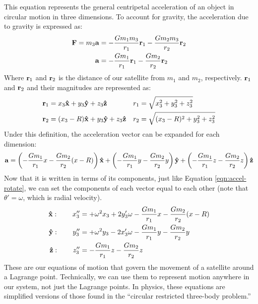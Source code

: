 This equation represents the general centripetal acceleration of an object in circular motion in three dimensions.
To account for gravity, the acceleration due to gravity is expressed as:
\begin{align*}
	\bm{\mathbf{F}} = m_3\bm{\mathbf{a}} &= - \frac{Gm_1m_3}{r_1}\bm{\mathbf{r}}_1 - \frac{Gm_2m_3}{r_2}\bm{\mathbf{r}}_2 \\
	\bm{\mathbf{a}} &= - \frac{Gm_1}{r_1}\bm{\mathbf{r}}_1 - \frac{Gm_2}{r_2}\bm{\mathbf{r}}_2
\end{align*}
Where $\bm{\mathbf{r}}_1$ and $\bm{\mathbf{r}}_2$ is the distance of our satellite from $m_1$ and $m_2$, respectively.
$\bm{\mathbf{r}}_1$ and $\bm{\mathbf{r}}_2$ and their magnitudes are represented as:
\begin{align*}
	\bvec{r}_1 &= x_3\uvec{x} + y_3\uvec{y} + z_3\uvec{z} & r_1 &= \sqrt{x_3^2 + y_3^2 + z_3^2} \\
	\bvec{r}_2 &= (x_3 - R)\uvec{x} + y_3\uvec{y} + z_3\uvec{z} & r_2 &= \sqrt{(x_3 - R)^2 + y_3^2 + z_3^2} 
\end{align*}
Under this definition, the acceleration vector can be expanded for each dimension:
\begin{equation*}
	\bvec{a} = \left(-\frac{Gm_1}{r_1}x - \frac{Gm_2}{r_2}(x - R)\right)\uvec{x} + \left(-\frac{Gm_1}{r_1}y - \frac{Gm_2}{r_2}y\right)\uvec{y} + \left(-\frac{Gm_1}{r_1}z - \frac{Gm_2}{r_2}z\right)\uvec{z}
\end{equation*}
Now that it is written in terms of its components, just like Equation \eqref{eqn:accel-rotate}, we can set the components of each vector equal to each other (note that $\theta' = \omega$, which is radial velocity).
\begin{align*}
	\uvec{x} : \qquad x_3'' &= + \omega^2x_3 + 2y_3'\omega -\frac{Gm_1}{r_1}x - \frac{Gm_2}{r_2}(x - R) \\
	\uvec{y} : \qquad y_3'' &= + \omega^2y_3 - 2x_3'\omega -\frac{Gm_1}{r_1}y - \frac{Gm_2}{r_2}y \\
	\uvec{z} : \qquad z_3'' &= -\frac{Gm_1}{r_1}z - \frac{Gm_2}{r_2}z
\end{align*}
These are our equations of motion that govern the movement of a satellite around a Lagrange point.
Technically, we can use them to represent motion anywhere in our system, not just the Lagrange points.
In physics, these equations are simplified versions of those found in the ``circular restricted three-body problem.'' 